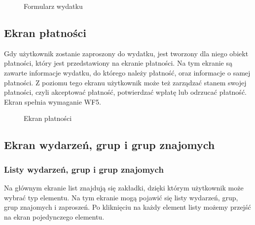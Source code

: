 \begin{figure}[h!]%
    \centering
    \qquad
    \qquad
    \caption{Formularz wydatku}%
\end{figure}

\clearpage
\subsection{Ekran płatności}
Gdy użytkownik zostanie zaproszony do wydatku, jest tworzony dla niego obiekt płatności, który jest przedstawiony na ekranie płatności. Na tym ekranie są zawarte informacje wydatku, do którego należy płatność, oraz informacje o samej płatności. Z poziomu tego ekranu użytkownik może też zarządzać stanem swojej płatności, czyli akceptować płatność, potwierdzać wpłatę lub odrzucać płatność. Ekran spełnia wymaganie WF5.

\begin{figure}[h!]%
    \centering
    \qquad
    \qquad
    \qquad
    \caption{Ekran płatności}%
\end{figure}

\clearpage
\subsection{Ekran wydarzeń, grup i grup znajomych}
\subsubsection{Listy wydarzeń, grup i grup znajomych}
Na głównym ekranie list znajdują się zakładki, dzięki którym użytkownik może wybrać typ elementu. Na tym ekranie mogą pojawić się listy wydarzeń, grup, grup znajomych i zaproszeń. Po kliknięciu na każdy element listy możemy przejść na ekran pojedynczego elementu.

